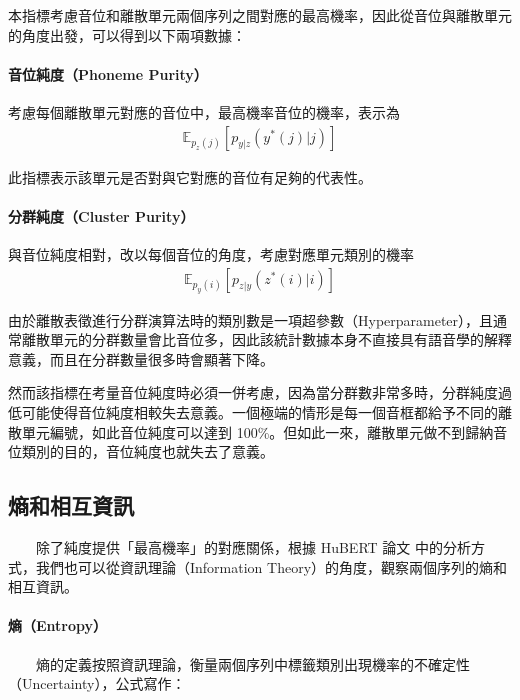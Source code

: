         本指標考慮音位和離散單元兩個序列之間對應的最高機率，因此從音位與離散單元的角度出發，可以得到以下兩項數據：

\paragraph{音位純度（Phoneme Purity）}

        考慮每個離散單元對應的音位中，最高機率音位的機率，表示為
    \begin{align}
      \mathbb{E}_{p_z(j)}\left[p_{y|z}(y^*(j)|j) \right]
    \end{align}

此指標表示該單元是否對與它對應的音位有足夠的代表性。

\paragraph{分群純度（Cluster Purity）}

        與音位純度相對，改以每個音位的角度，考慮對應單元類別的機率
    \begin{align}
      \mathbb{E}_{p_y(i)}\left[p_{z|y}(z^*(i)|i) \right]
    \end{align}

        由於離散表徵進行分群演算法時的類別數是一項超參數（Hyperparameter），且通常離散單元的分群數量會比音位多，因此該統計數據本身不直接具有語音學的解釋意義，而且在分群數量很多時會顯著下降。

        然而該指標在考量音位純度時必須一併考慮，因為當分群數非常多時，分群純度過低可能使得音位純度相較失去意義。一個極端的情形是每一個音框都給予不同的離散單元編號，如此音位純度可以達到 100\%。但如此一來，離散單元做不到歸納音位類別的目的，音位純度也就失去了意義。

\subsection{熵和相互資訊}

　　除了純度提供「最高機率」的對應關係，根據 HuBERT 論文 \cite{hsu_hubert_2021-2} 中的分析方式，我們也可以從資訊理論（Information Theory）的角度，觀察兩個序列的熵和相互資訊。

\paragraph{熵（Entropy）}

　　熵的定義按照資訊理論，衡量兩個序列中標籤類別出現機率的不確定性（Uncertainty），公式寫作：

